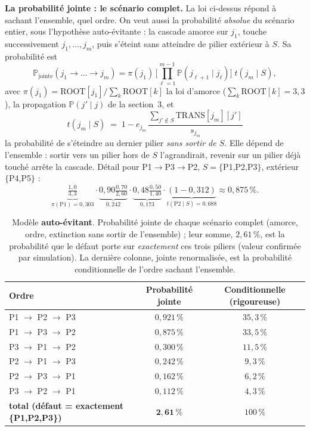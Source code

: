 \documentclass[11pt,a4paper]{article}
\begin{document}
\medskip
\noindent\textbf{La probabilité jointe : le scénario complet.} La loi ci-dessus répond à
\og{}sachant l'ensemble, quel ordre\fg{}. On veut aussi la probabilité \emph{absolue} du scénario
entier, sous l'hypothèse auto-évitante : \og{}la cascade amorce sur $j_1$, touche successivement
$j_1,\dots,j_m$, puis s'éteint sans atteindre de pilier extérieur à $S$\fg{}. Sa probabilité est
\begin{equation}
\mathbb P_{\text{jointe}}(j_1\to\dots\to j_m)
= \pi(j_1)\,\Big[\prod_{\ell=1}^{m-1}\mathbb P(j_{\ell+1}\mid j_\ell)\Big]\;t(j_m\mid S),
\end{equation}
avec $\pi(j_1)=\text{ROOT}[j_1]/\sum_k\text{ROOT}[k]$ la loi d'amorce ($\sum_k\text{ROOT}[k]=3{,}3$), la
propagation $\mathbb P(j'\mid j)$ de la section~3, et
\[
t(j_m\mid S)\;=\;1 - e_{j_m}\,\frac{\sum_{j'\notin S}\text{TRANS}[j_m][j']}{s_{j_m}}
\]
la probabilité de s'éteindre au dernier pilier \emph{sans sortir de $S$}. Elle dépend de
l'ensemble : sortir vers un pilier hors de $S$ l'agrandirait, revenir sur un pilier déjà touché
arrête la cascade. Détail pour P1$\to$P3$\to$P2, $S=\{$P1,P2,P3$\}$, extérieur $\{$P4,P5$\}$ :
\[
\underbrace{\tfrac{1{,}0}{3{,}3}}_{\pi(\text{P1})=0{,}303}\cdot
\underbrace{0{,}90\tfrac{0{,}70}{2{,}60}}_{0{,}242}\cdot
\underbrace{0{,}48\tfrac{0{,}50}{1{,}40}}_{0{,}173}\cdot
\underbrace{(1-0{,}312)}_{t(\text{P2}\mid S)=0{,}688}
\approx 0{,}875\,\% .
\]

\begin{table}[h]\centering\small
\renewcommand{\arraystretch}{1.3}
\begin{tabular}{@{}lcc@{}}
\toprule
Ordre & Probabilité jointe & Conditionnelle (rigoureuse) \\
\midrule
\rowcolor{lightblue!40} P1 $\to$ P2 $\to$ P3 & $0{,}921\,\%$ & $35{,}3\,\%$ \\
P1 $\to$ P3 $\to$ P2 & $0{,}875\,\%$ & $33{,}5\,\%$ \\
P3 $\to$ P1 $\to$ P2 & $0{,}300\,\%$ & $11{,}5\,\%$ \\
P2 $\to$ P1 $\to$ P3 & $0{,}242\,\%$ & $9{,}3\,\%$ \\
P2 $\to$ P3 $\to$ P1 & $0{,}162\,\%$ & $6{,}2\,\%$ \\
P3 $\to$ P2 $\to$ P1 & $0{,}112\,\%$ & $4{,}3\,\%$ \\
\midrule
\textbf{total (défaut = exactement \{P1,P2,P3\})} & $\mathbf{2{,}61\,\%}$ & $100\,\%$ \\
\bottomrule
\end{tabular}
\caption{Modèle \textbf{auto-évitant}. Probabilité jointe de chaque scénario complet (amorce,
ordre, extinction sans sortir de l'ensemble) ; leur somme, $2{,}61\,\%$, est la probabilité que le
défaut porte sur \emph{exactement} ces trois piliers (valeur confirmée par simulation). La
dernière colonne, jointe renormalisée, est la probabilité conditionnelle de l'ordre sachant
l'ensemble.}
\end{table}
\end{document}
